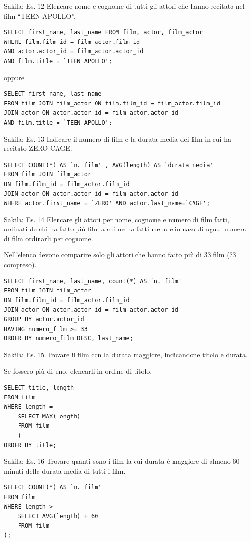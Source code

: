 %
\begin{frame}[fragile]{Sakila: Es. 12}
Elencare nome e cognome di tutti gli attori che hanno recitato nel film ``TEEN APOLLO''.
\pause
\begin{lstlisting}
SELECT first_name, last_name FROM film, actor, film_actor
WHERE film.film_id = film_actor.film_id
AND actor.actor_id = film_actor.actor_id
AND film.title = `TEEN APOLLO';
\end{lstlisting}
\pause
oppure
\begin{lstlisting}
SELECT first_name, last_name
FROM film JOIN film_actor ON film.film_id = film_actor.film_id
JOIN actor ON actor.actor_id = film_actor.actor_id
AND film.title = `TEEN APOLLO';
\end{lstlisting}
\end{frame}
%
\begin{frame}[fragile]{Sakila: Es. 13}
\vspace{.5cm}
Indicare il numero di film e la durata media dei film in cui ha recitato ZERO CAGE.
\pause
\begin{lstlisting}
SELECT COUNT(*) AS `n. film' , AVG(length) AS `durata media'
FROM film JOIN film_actor
ON film.film_id = film_actor.film_id 
JOIN actor ON actor.actor_id = film_actor.actor_id
WHERE actor.first_name = `ZERO' AND actor.last_name=`CAGE';
\end{lstlisting}
\end{frame}
%
\begin{frame}[fragile]{Sakila: Es. 14}
Elencare gli attori per nome, cognome e numero di film fatti, ordinati da chi ha fatto pi\`u film a chi ne ha fatti meno e in caso di ugual numero di film ordinarli per cognome.

Nell'elenco devono comparire solo gli attori che hanno fatto pi\`u di 33 film (33 compreso).
\pause
\begin{lstlisting}
SELECT first_name, last_name, count(*) AS `n. film'
FROM film JOIN film_actor
ON film.film_id = film_actor.film_id 
JOIN actor ON actor.actor_id = film_actor.actor_id
GROUP BY actor.actor_id
HAVING numero_film >= 33
ORDER BY numero_film DESC, last_name;
\end{lstlisting}
\end{frame}
%
\begin{frame}[fragile]{Sakila: Es. 15}
Trovare il film con la durata maggiore, indicandone titolo e durata.

Se fossero pi\`u di uno, elencarli in ordine di titolo.
\pause
\begin{lstlisting}
SELECT title, length
FROM film
WHERE length = (
    SELECT MAX(length)
    FROM film
    )
ORDER BY title;
\end{lstlisting}
\end{frame}
%
\begin{frame}[fragile]{Sakila: Es. 16}
Trovare quanti sono i film la cui durata \`e maggiore di almeno 60 minuti della durata media di tutti i film.
\pause
\begin{lstlisting}
SELECT COUNT(*) AS `n. film'
FROM film
WHERE length > (
    SELECT AVG(length) + 60
    FROM film
);
\end{lstlisting}
\end{frame}
%